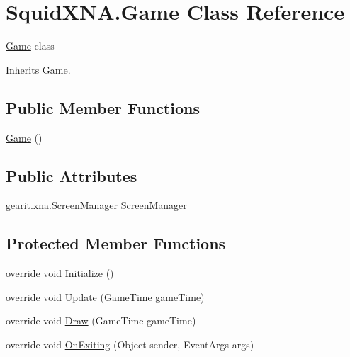 \hypertarget{class_squid_x_n_a_1_1_game}{\section{Squid\+X\+N\+A.\+Game Class Reference}
\label{class_squid_x_n_a_1_1_game}
}


\hyperlink{class_squid_x_n_a_1_1_game}{Game} class  




Inherits Game.

\subsection*{Public Member Functions}
\begin{DoxyCompactItemize}
\item 
\hyperlink{class_squid_x_n_a_1_1_game_af2cbbfe5006cf58790de4d3826e22473}{Game} ()
\end{DoxyCompactItemize}
\subsection*{Public Attributes}
\begin{DoxyCompactItemize}
\item 
\hyperlink{classgearit_1_1xna_1_1_screen_manager}{gearit.\+xna.\+Screen\+Manager} \hyperlink{class_squid_x_n_a_1_1_game_abf0692264d6fe78b14676847fbe0103f}{Screen\+Manager}
\end{DoxyCompactItemize}
\subsection*{Protected Member Functions}
\begin{DoxyCompactItemize}
\item 
override void \hyperlink{class_squid_x_n_a_1_1_game_a8ce18e1111b5f66c39bf85f00429fc8c}{Initialize} ()
\item 
override void \hyperlink{class_squid_x_n_a_1_1_game_a6c4cab185259ef011d4be9d09caaacfa}{Update} (Game\+Time game\+Time)
\item 
override void \hyperlink{class_squid_x_n_a_1_1_game_a4d511b208bfb3e22b344c3b42679cda4}{Draw} (Game\+Time game\+Time)
\item 
override void \hyperlink{class_squid_x_n_a_1_1_game_aaa33570e515b322ef1d74b95a2a171b3}{On\+Exiting} (Object sender, Event\+Args args)
\end{DoxyCompactItemize}


